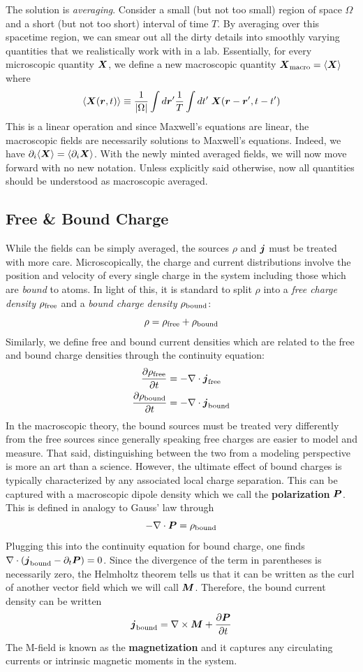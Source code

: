 \documentclass[twocolumn]{gwclass}
\begin{document}
	The solution is \emph{averaging}. Consider a small (but not too small) region of space $\Omega$ and a short (but not too short) interval of time $T$. By averaging over this spacetime region, we can smear out all the dirty details into smoothly varying quantities that we realistically work with in a lab. Essentially, for every microscopic quantity $\boldsymbol{X}$, we define a new macroscopic quantity $\boldsymbol{X}_{\text{\normalfont{macro}}} = \langle \boldsymbol{X} \rangle$ where
	$$ \langle\boldsymbol{X}(\boldsymbol{r},t)\rangle \equiv \frac{1}{|\Omega|}\int d\boldsymbol{r}'\frac{1}{T}\int dt'\;\boldsymbol{X}(\boldsymbol{r}-\boldsymbol{r}',t-t') $$
	This is a linear operation and since Maxwell's equations are linear, the macroscopic fields are necessarily solutions to Maxwell's equations. Indeed, we have $\partial_i\langle\boldsymbol{X}\rangle = \langle \partial_i\boldsymbol{X}\rangle$.
	With the newly minted averaged fields, we will now move forward with no new notation. Unless explicitly said otherwise, now all quantities should be understood as macroscopic averaged.
	
	\subsection{Free \& Bound Charge}
	While the fields can be simply averaged, the sources $\rho$ and $\boldsymbol{j}$ must be treated with more care. Microscopically, the charge and current distributions involve the position and velocity of every single charge in the system including those which are \emph{bound} to atoms. In light of this, it is standard to split $\rho$ into a \emph{free charge density} $\rho_{\text{\normalfont{free}}}$ and a \emph{bound charge density} $\rho_{\text{\normalfont{bound}}}$:
	$$ \rho = \rho_{\text{\normalfont{free}}} + \rho_{\text{\normalfont{bound}}} $$
	Similarly, we define free and bound current densities which are related to the free and bound charge densities through the continuity equation:
	\begin{align*}
		\frac{\partial \rho_{\text{\normalfont{free}}}}{\partial t} &= -\nabla\cdot\boldsymbol{j}_{\text{\normalfont{free}}}\\
		\frac{\partial \rho_{\text{\normalfont{bound}}}}{\partial t} &= -\nabla\cdot\boldsymbol{j}_{\text{\normalfont{bound}}}
	\end{align*}
	In the macroscopic theory, the bound sources must be treated very differently from the free sources since generally speaking free charges are easier to model and measure. That said, distinguishing between the two from a modeling perspective is more an art than a science. However, the ultimate effect of bound charges is typically characterized by any associated local charge separation. This can be captured with a macroscopic dipole density which we call the \textbf{polarization} $\boldsymbol{P}$. This is defined in analogy to Gauss' law through
	$$ -\nabla\cdot\boldsymbol{P} = \rho_{\text{\normalfont{bound}}} $$
	Plugging this into the continuity equation for bound charge, one finds $\nabla\cdot(\boldsymbol{j}_{\text{\normalfont{bound}}} - \partial_t\boldsymbol{P})=0$. Since the divergence of the term in parentheses is necessarily zero, the Helmholtz theorem tells us that it can be written as the curl of another vector field which we will call $\boldsymbol{M}$. Therefore, the bound current density can be written
	$$\boldsymbol{j}_{\text{\normalfont{bound}}} = \nabla\times\boldsymbol{M} + \frac{\partial\boldsymbol{P}}{\partial t}$$
	The M-field is known as the \textbf{magnetization} and it captures any circulating currents or intrinsic magnetic moments in the system.
	
\end{document}
